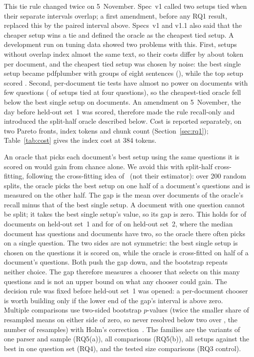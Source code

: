 This tie rule changed twice on 5~November. Spec~v1 called two setups tied when
their separate intervals overlap; a first amendment, before any RQ1 result,
replaced this by the paired interval above. Specs~v1 and v1.1 also said that the
cheaper setup wins a tie and defined the oracle as the cheapest tied setup. A
development run on tuning data showed two problems with this. First, setups
without overlap index almost the same text, so their costs differ by about
\TieCostDifference{} token per document, and the cheapest tied setup was chosen by noise: the
best single setup became pdfplumber with groups of eight sentences (\CheapestTieBestRecall{}),
while the top setup scored \TuningTopRecall{}. Second, per-document tie tests have almost
no power on documents with few questions (\TieUnresolvedSetups{} of \TuningSetups{} setups tied at four
questions), so the cheapest-tied oracle fell below the best single setup on
\CheapestOracleBelowDocuments{} documents. An amendment on 5~November, the day before held-out set~1 was
scored, therefore made the rule recall-only and introduced the split-half
oracle described below. Cost is reported separately, on two Pareto fronts,
index tokens and chunk count (Section~\ref{sec:rq1}); Table~\ref{tab:cost}
gives the index cost at 384 tokens.

An oracle that picks each document's best setup using the same questions it is
scored on would gain from chance alone. We avoid this with split-half
cross-fitting, following the cross-fitting idea of~\cite{crossfitting} (not
their estimator): over 200 random splits, the oracle picks the best setup on one
half of a document's questions and is measured on the other half. The gap is
the mean over documents of the oracle's recall minus that of the best single
setup. A document with one question cannot be split; it takes the best single
setup's value, so its gap is zero. This holds for \RQoneOneQuestionDocuments{} of
\RQoneDocuments{} documents on held-out set~1 and for
\RQoneHTwoOneQuestionDocuments{} of \RQoneHTwoDropRuleDocuments{} on held-out
set~2, where the median document has \RQoneHTwoMedianQuestions{} questions and
\RQoneHTwoTwoQuestionDocuments{} documents have two, so the oracle there often
picks on a single question. The two sides are not symmetric: the best single
setup is chosen on the questions it is scored on, while the oracle is
cross-fitted on half of a document's questions. Both push the gap down, and the
bootstrap repeats neither choice. The gap therefore measures a chooser that
selects on this many questions and is not an upper bound on what any chooser could gain. The decision rule was fixed before held-out set~1 was opened: a
per-document chooser is worth building only if the lower end of the gap's
interval is above zero. Multiple comparisons use two-sided bootstrap $p$-values
(twice the smaller share of resampled means on either side of zero, so never
resolved below two over \Resamples{}, the number of resamples) with Holm's correction~\cite{holm}. The families are
the variants of one parser and sample (RQ5(a)), all comparisons (RQ5(b)), all
setups against the best in one question set (RQ4), and the tested size
comparisons (RQ3 control).

